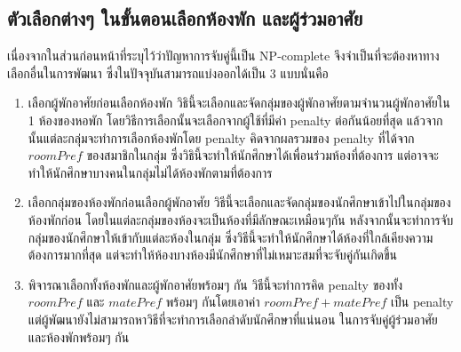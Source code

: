 \subsection{ตัวเลือกต่างๆ ในขั้นตอนเลือกห้องพัก และผู้ร่วมอาศัย}
เนื่องจากในส่วนก่อนหน้าที่ระบุไว้ว่าปัญหาการจับคู่นี้เป็น NP-complete จึงจำเป็นที่จะต้องหาทางเลือกอื่นในการพัฒนา 
ซึ่งในปัจจุบันสามารถแบ่งออกได้เป็น 3 แบบนั่นคือ
\begin{enumerate}
  \item เลือกผู้พักอาศัยก่อนเลือกห้องพัก 
    วิธินี้จะเลือกและจัดกลุ่มของผู้พักอาศัยตามจำนวนผู้พักอาศัยใน 1 ห้องของหอพัก โดยวิธีการเลือกนั้นจะเลือกจากผู้ใช้ที่มีค่า penalty ต่อกันน้อยที่สุด
    แล้วจากนั้นแต่ละกลุ่มจะทำการเลือกห้องพักโดย penalty คิดจากผลรวมของ penalty ที่ได้จาก $roomPref$ ของสมาชิกในกลุ่ม
    ซึ่งวิธินี้จะทำให้นักศึกษาได้เพื่อนร่วมห้องที่ต้องการ แต่อาจจะทำให้นักศึกษาบางคนในกลุ่มไม่ได้ห้องพักตามที่ต้องการ
  \item เลือกกลุ่มของห้องพักก่อนเลือกผู้พักอาศัย
    วิธีนี้จะเลือกและจัดกลุ่มของนักศึกษาเข้าไปในกลุ่มของห้องพักก่อน โดยในแต่ละกลุ่มของห้องจะเป็นห้องที่มีลักษณะเหมือนๆกัน
    หลังจากนั้นจะทำการจับกลุ่มของนักศึกษาให้เข้ากับแต่ละห้องในกลุ่ม ซึ่งวิธีนี้จะทำให้นักศึกษาได้ห้องที่ใกล้เคียงความต้องการมากที่สุด 
    แต่จะทำให้ห้องบางห้องมีนักศึกษาที่ไม่เหมาะสมที่จะจับคู่กันเกิดขึ้น
  \item พิจารณาเลือกทั้งห้องพักและผู้พักอาศัยพร้อมๆ กัน 
    วิธีนี้จะทำการคิด penalty ของทั้ง $roomPref$ และ $matePref$ พร้อมๆ กันโดยเอาค่า $roomPref + matePref$ เป็น penalty
    แต่ผู้พัฒนายังไม่สามารถหาวิธีที่จะทำการเลือกลำดับนักศึกษาที่แน่นอน ในการจับคู่ผู้ร่วมอาศัยและห้องพักพร้อมๆ กัน
\end{enumerate}

